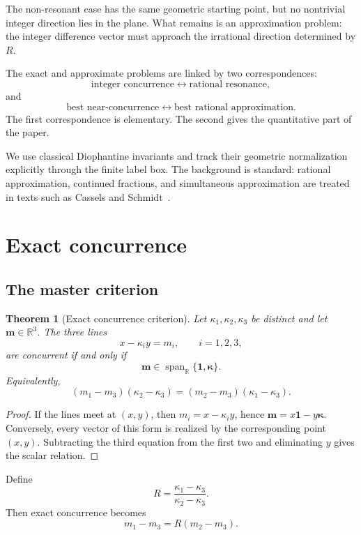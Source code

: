 \documentclass[11pt,a4paper]{article}
\newtheorem{theorem}{Theorem}[section]
\begin{document}
The non-resonant case has the same geometric starting point, but no nontrivial integer direction lies in the plane. What remains is an approximation problem: the integer difference vector must approach the irrational direction determined by $R$.

The exact and approximate problems are linked by two correspondences:
\[
\boxed{\text{integer concurrence}}
\longleftrightarrow
\boxed{\text{rational resonance}},
\]
and
\[
\boxed{\text{best near-concurrence}}
\longleftrightarrow
\boxed{\text{best rational approximation}}.
\]
The first correspondence is elementary. The second gives the quantitative part of the paper.

We use classical Diophantine invariants and track their geometric normalization explicitly through the finite label box. The background is standard: rational approximation, continued fractions, and simultaneous approximation are treated in texts such as Cassels and Schmidt~\cite{cassels,schmidt1980,hardywright}.

\section{Exact concurrence}
\subsection{The master criterion}

\begin{theorem}[Exact concurrence criterion]\label{thm:exact}
Let $\kappa_1,\kappa_2,\kappa_3$ be distinct and let $\mathbf m\in\mathbb R^3$. The three lines
\[
x-\kappa_i y=m_i,\qquad i=1,2,3,
\]
are concurrent if and only if
\[
\mathbf m\in\operatorname{span}_{\mathbb R}\{\mathbf1,\boldsymbol\kappa\}.
\]
Equivalently,
\[
(m_1-m_3)(\kappa_2-\kappa_3)
=(m_2-m_3)(\kappa_1-\kappa_3).
\]
\end{theorem}

\begin{proof}
If the lines meet at $(x,y)$, then $m_i=x-\kappa_i y$, hence
$\mathbf m=x\mathbf1-y\boldsymbol\kappa$. Conversely, every vector of this form is realized by
the corresponding point $(x,y)$. Subtracting the third equation from the first two and eliminating
$y$ gives the scalar relation.
\end{proof}

Define
\[
R=\frac{\kappa_1-\kappa_3}{\kappa_2-\kappa_3}.
\]
Then exact concurrence becomes
\[
m_1-m_3=R(m_2-m_3).
\]
\end{document}
